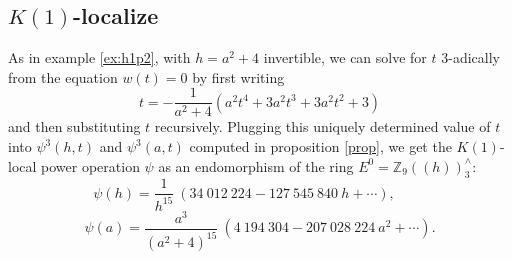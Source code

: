 \documentclass{gtpart}
\theoremstyle{definition}
\theoremstyle{remark}
\newcommand{\mb}[1]{\mathbb{#1}}
\begin{document}
\subsection{$K(1)$-localize}
\label{subsec:step3}

As in example \ref{ex:h1p2}, with $h = a^2 + 4$ invertible, we can solve for 
$t$ 3-adically from the equation $w(t) = 0$ by first writing 
\[
 t = -\frac{1}{a^2 + 4}(a^2 t^4 + 3 a^2 t^3 + 3 a^2 t^2 + 3) 
\]
and then substituting $t$ recursively.  Plugging this uniquely determined 
value of $t$ into $\psi^3(h,t)$ and $\psi^3(a,t)$ computed in proposition 
\ref{prop}, we get the $K(1)$-local power operation $\psi$ as an endomorphism 
of the ring $E^0 = {\mb Z}_9 (\!(h)\!)_3^\wedge$: 
\[
 \psi(h) = \frac{1}{h^{15}}~(34~012~224 - 127~545~840~h + \cdots), ~~~~~~~~~~ 
\]
\[
 \psi(a) = \frac{a^3}{(a^2+4)^{15}}~(4~194~304 - 207~028~224~a^2 + \cdots).  
\]


\newpage

%
%
\end{document}
